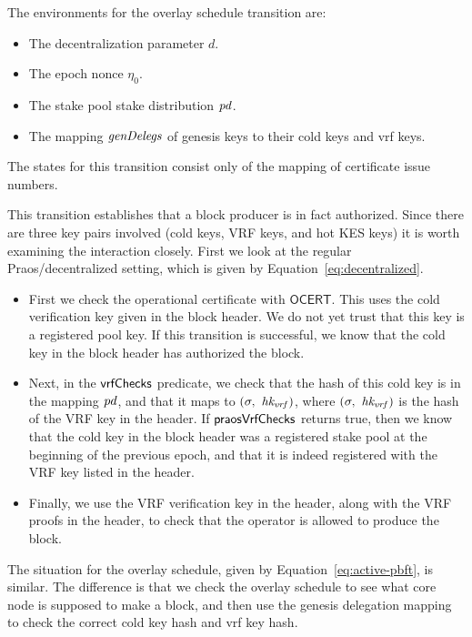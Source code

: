 The environments for the overlay schedule transition are:
\begin{itemize}
  \item The decentralization parameter $d$.
  \item The epoch nonce $\eta_0$.
  \item The stake pool stake distribution $\mathit{pd}$.
  \item The mapping $\mathit{genDelegs}$ of genesis keys to their cold keys and vrf keys.
\end{itemize}

The states for this transition consist only of the mapping of certificate issue numbers.

This transition establishes that a block producer is in fact authorized.
Since there are three key pairs involved (cold keys, VRF keys, and hot KES keys)
it is worth examining the interaction closely.
First we look at the regular Praos/decentralized setting,
which is given by Equation~\ref{eq:decentralized}.

\begin{itemize}
  \item First we check the operational certificate with $\mathsf{OCERT}$.
  This uses the cold verification key given in the block header.
  We do not yet trust that this key is a registered pool key.
  If this transition is successful, we know that the cold key in the block header has authorized
  the block.
\item  Next, in the $\mathsf{vrfChecks}$ predicate, we check that the hash of this cold key is in the
  mapping $\mathit{pd}$, and that it maps to $(\sigma,~\mathit{hk_{vrf}})$, where
  $(\sigma,~\mathit{hk_{vrf}})$ is the hash of the VRF key in the header.
  If $\mathsf{praosVrfChecks}$ returns true, then we know that the cold key in the block header was a
  registered stake pool at the beginning of the previous epoch, and that it is indeed registered
  with the VRF key listed in the header.
\item Finally, we use the VRF verification key in the header, along with the VRF proofs in the
  header, to check that the operator is allowed to produce the block.
\end{itemize}
The situation for the overlay schedule, given by Equation~\ref{eq:active-pbft}, is similar.
The difference is that we check the overlay schedule to see what core node is
supposed to make a block, and then use the genesis delegation mapping to
check the correct cold key hash and vrf key hash.

